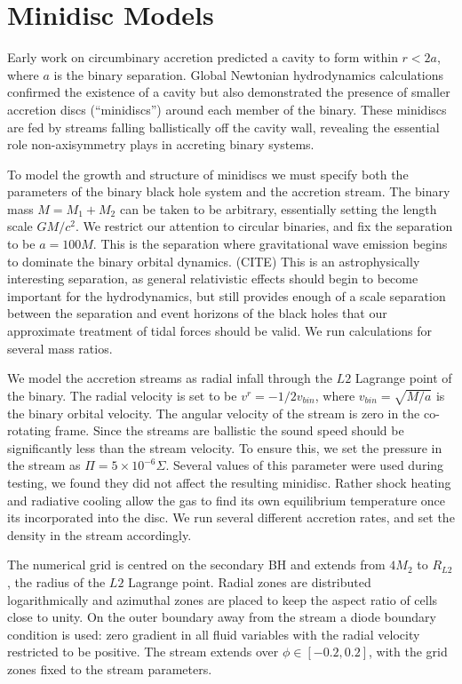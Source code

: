 \documentclass{emulateapj}
\newcommand{\Sig}{\Sigma}
\begin{document}

\section{Minidisc Models}
\label{sec:models}

Early work on circumbinary accretion predicted a cavity to form within $r<2a$, where $a$ is the binary separation. Global Newtonian hydrodynamics calculations confirmed the existence of a cavity but also demonstrated the presence of smaller accretion discs (``minidiscs'') around each member of the binary.  These minidiscs are fed by streams falling ballistically off the cavity wall, revealing the essential role non-axisymmetry plays in accreting binary systems.

To model the growth and structure of minidiscs we must specify both the parameters of the binary black hole system and the accretion stream.  The binary mass $M = M_1+M_2$ can be taken to be arbitrary, essentially setting the length scale $GM/c^2$.  We restrict our attention to circular binaries, and fix the separation to be $a = 100M$.  This is the separation where gravitational wave emission begins to dominate the binary orbital dynamics. (CITE)  This is an astrophysically interesting separation, as general relativistic effects should begin to become important for the hydrodynamics, but still provides enough of a scale separation between the separation and event horizons of the black holes that our approximate treatment of tidal forces should be valid.  We run calculations for several mass ratios.

We model the accretion streams as radial infall through the $L2$ Lagrange point of the binary.  The radial velocity is set to be $v^r = -1/2 v_{bin}$, where $v_{bin} = \sqrt{M/a}$ is the binary orbital velocity.  The angular velocity of the stream is zero in the co-rotating frame.  Since the streams are ballistic the sound speed should be significantly less than the stream velocity.  To ensure this, we set the pressure in the stream as $\Pi = 5 \times 10^{-6} \Sig$.  Several values of this parameter were used during testing, we found they did not affect the resulting minidisc. Rather shock heating and radiative cooling allow the gas to find its own equilibrium temperature once its incorporated into the disc.  We run several different accretion rates, and set the density in the stream accordingly.

The numerical grid is centred on the secondary BH and extends from $4 M_2$ to $R_{L2}$, the radius of the $L2$ Lagrange point. Radial zones are distributed logarithmically and azimuthal zones are placed to keep the aspect ratio of cells close to unity.  On the outer boundary away from the stream a diode boundary condition is used: zero gradient in all fluid variables with the radial velocity restricted to be positive.  The stream extends over $\phi \in [-0.2, 0.2]$, with the grid zones fixed to the stream parameters.  
\end{document}
